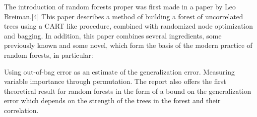 The introduction of random forests proper was first made in a paper by Leo Breiman.[4] This paper describes a method of building a forest of uncorrelated trees using a CART like procedure, combined with randomized node optimization and bagging. In addition, this paper combines several ingredients, some previously known and some novel, which form the basis of the modern practice of random forests, in particular:

Using out-of-bag error as an estimate of the generalization error.
Measuring variable importance through permutation.
The report also offers the first theoretical result for random forests in the form of a bound on the generalization error which depends on the strength of the trees in the forest and their correlation.
